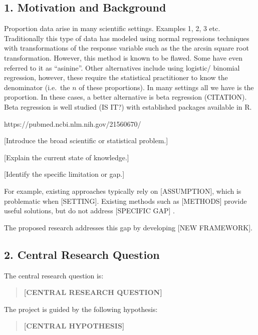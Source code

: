 \documentclass[
  11pt,
  letterpaper,
]{article}
\author{}
\date{}
\begin{document}
\subsection{1. Motivation and
Background}\label{motivation-and-background}

Proportion data arise in many scientific settings. Examples 1, 2, 3 etc.
Traditionally this type of data has modeled using normal regressions
techniques with transformations of the response variable such as the the
arcsin square root transformation. However, this method is known to be
flawed. Some have even referred to it as ``asinine''. Other alternatives
include using logistic/ binomial regression, however, these require the
statistical practitioner to know the denominator (i.e.~the \(n\) of
these proportions). In many settings all we have is the proportion. In
these cases, a better alternative is beta regression (CITATION). Beta
regression is well studied (IS IT?) with established packages available
in R. \citet{Kosmidis2026}

https://pubmed.ncbi.nlm.nih.gov/21560670/

{[}Introduce the broad scientific or statistical problem.{]}

{[}Explain the current state of knowledge.{]}

{[}Identify the specific limitation or gap.{]}

For example, existing approaches typically rely on {[}ASSUMPTION{]},
which is problematic when {[}SETTING{]}. Existing methods such as
{[}METHODS{]} provide useful solutions, but do not address {[}SPECIFIC
GAP{]} \citep{example2024}.

The proposed research addresses this gap by developing {[}NEW
FRAMEWORK{]}.

\subsection{2. Central Research
Question}\label{central-research-question}

The central research question is:

\begin{quote}
\textbf{{[}CENTRAL RESEARCH QUESTION{]}}
\end{quote}

The project is guided by the following hypothesis:

\begin{quote}
\textbf{{[}CENTRAL HYPOTHESIS{]}}
\end{quote}
\end{document}
